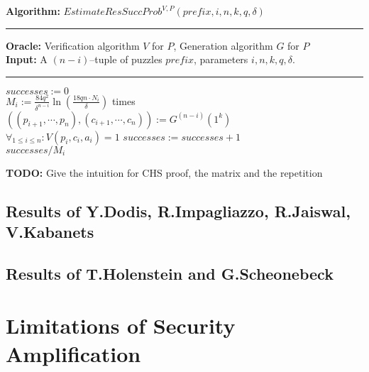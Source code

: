 \documentclass[11pt,a4paper,titlepage]{memoir}
\begin{document}
%
\begin{codeblock}
  \textbf{Algorithm:} $\mathit{EstimateResSuccProb}^{V,P}(\mathit{prefix}, i, n, k, q, \delta)$
  \medskip \hrule
  \textbf{Oracle:} Verification algorithm $V$ for $P$, Generation algorithm $G$ for $P$\\
  \textbf{Input:} A $(n-i)$--tuple of puzzles $\mathit{prefix}$, parameters $i, n, k, q, \delta$.
  \medskip\hrule
  $successes := 0$ \\
  \Repeat $M_i := \frac{84q^2}{\delta^{n-i}} \ln(\frac{18qn \cdot N_i}{\delta})$ times \\
  \IndI $((p_{i+1}, \cdots, p_n), (c_{i+1}, \cdots, c_n)) := G^{(n-i)}(1^k)$\\
  \IndI \If $\forall_{1 \leq i \leq n} : V(p_i, c_i, a_i) = 1$ \Then $\mathit{successes := successes + 1}$ \\
  \Return $successes / M_i$
\end{codeblock}
%
\begin{todo}
  \textbf{TODO:} Give the intuition for CHS proof, the matrix and the repetition
\end{todo}
%
%
\subsection{Results of Y.Dodis, R.Impagliazzo, R.Jaiswal, V.Kabanets}
\subsection{Results of T.Holenstein and G.Scheonebeck}
\section{Limitations of Security Amplification}



\appendix


\backmatter



\end{document}
